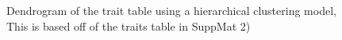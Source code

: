 \documentclass[
]{article}
\begin{document}
\begin{figure}


\caption{\label{fig-dendro}Dendrogram of the trait table using a
hierarchical clustering model, This is based off of the traits table in
SuppMat 2)}

\end{figure}%
\end{document}
